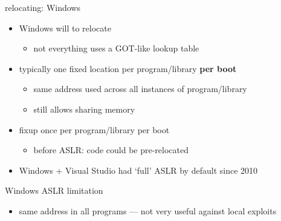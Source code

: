 
\begin{frame}{relocating: Windows}
    \begin{itemize}
        \item Windows will  to relocate
            \begin{itemize}
            \item not everything uses a GOT-like lookup table
            \end{itemize}
        \item typically one fixed location per program/library \textbf{per boot}
            \begin{itemize}
                \item same address used across all instances of program/library
                \item still allows sharing memory
            \end{itemize}
        \item fixup once per program/library per boot
            \begin{itemize}
                \item before ASLR: code could be pre-relocated
            \end{itemize}
        \item Windows + Visual Studio had `full' ASLR by default since 2010
    \end{itemize}
\end{frame}

\begin{frame}{Windows ASLR limitation}
    \begin{itemize}
        \item same address in all programs --- not very useful against local exploits
    \end{itemize}
\end{frame}

